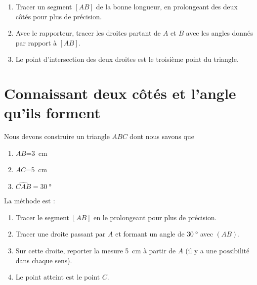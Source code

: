 \begin{enumerate}
    \item
        Tracer un segment $[AB]$ de la bonne longueur, en prolongeant des deux côtés pour plus de précision.

\begin{center}
   
\end{center}
\item
    Avec le rapporteur, tracer les droites partant de \( A\) et \( B\) avec les angles donnés par rapport à \( [AB] \).

\begin{center}
   
\end{center}

\item

    Le point d'intersection des deux droites est le troisième point du triangle.

\begin{center}
   
\end{center}

\end{enumerate}

\section{Connaissant deux côtés et l'angle qu'ils forment}

Nous devons construire un triangle \( ABC\) dont nous savons que
\begin{enumerate}
    \item
        \( AB\)=\SI{3}{\centi\meter}
    \item
        \( AC\)=\SI{5}{\centi\meter}
    \item
        \( \widehat{CAB}=\SI{30}{\degree}\)
\end{enumerate}

La méthode est :
\begin{enumerate}
    \item
        Tracer le segment \( [AB]\) en le prolongeant pour plus de précision.
    \item
        Tracer une droite passant par \( A\) et formant un angle de \( \SI{30}{\degree}\) avec \( (AB)\).
    \item
        Sur cette droite, reporter la mesure \SI{5}{\centi\meter} à partir de \( A\) (il y a une possibilité dans chaque sens).
    \item
        Le point atteint est le point \( C\).
\end{enumerate}

